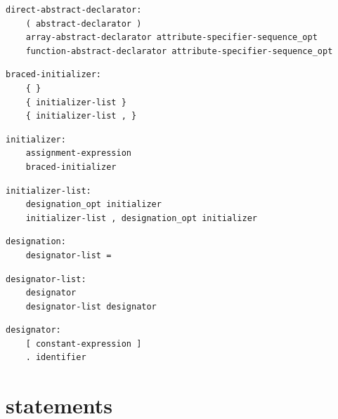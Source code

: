 \noindent\textbf{\texttt{}}\par
\begin{lstlisting}
direct-abstract-declarator:
    ( abstract-declarator )
    array-abstract-declarator attribute-specifier-sequence_opt
    function-abstract-declarator attribute-specifier-sequence_opt
\end{lstlisting}

\noindent\textbf{\texttt{}}\par
\begin{lstlisting}
braced-initializer:
    { }
    { initializer-list }
    { initializer-list , }
\end{lstlisting}

\noindent\textbf{\texttt{}}\par
\begin{lstlisting}
initializer:
    assignment-expression
    braced-initializer
\end{lstlisting}

\noindent\textbf{\texttt{}}\par
\begin{lstlisting}
initializer-list:
    designation_opt initializer
    initializer-list , designation_opt initializer
\end{lstlisting}

\noindent\textbf{\texttt{}}\par
\begin{lstlisting}
designation:
    designator-list =
\end{lstlisting}

\noindent\textbf{\texttt{}}\par
\begin{lstlisting}
designator-list:
    designator
    designator-list designator
\end{lstlisting}

\noindent\textbf{\texttt{}}\par
\begin{lstlisting}
designator:
    [ constant-expression ]
    . identifier
\end{lstlisting}

\section{statements}

